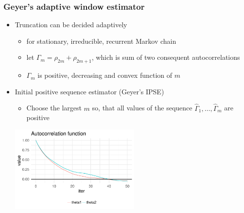 \documentclass[10pt,handout]{beamer}
\begin{document}
\begin{frame}

\frametitle{ Geyer's adaptive window estimator}

  \begin{itemize}
  \item Truncation can be decided adaptively
    \begin{itemize}
    \item for stationary, irreducible, recurrent Markov chain
    \item let $\Gamma_m=\rho_{2m}+\rho_{2m+1}$, which is sum of two
      consequent autocorrelations
    \item $\Gamma_m$ is positive, decreasing and convex function of $m$
    \end{itemize}
    \vspace{0.5\baselineskip}
  \item<2-> Initial positive sequence estimator (Geyer's IPSE)
      \begin{itemize}
        \item Choose the largest $m$ so, that all values of the sequence
        $\hat{\Gamma}_1, \ldots, \hat{\Gamma}_m$ are positive
      \end{itemize}
  \vspace{0.5\baselineskip}
      \includegraphics[width=6.5cm]{figs/Metrop1acf.pdf}
  \end{itemize}
\end{frame}

\end{document}
